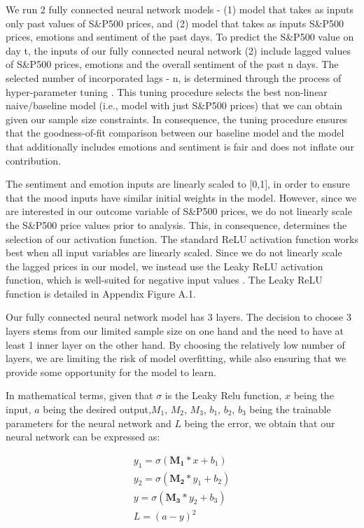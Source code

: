 We run 2 fully connected neural network models - (1) model that takes as inputs only past values of S\&P500 prices, and (2) model that takes as inputs S\&P500 prices, emotions and sentiment of the past days. To predict the S\&P500 value on day t, the inputs of our fully connected neural network (2) include lagged values of S\&P500 prices, emotions and the overall sentiment of the past n days. The selected number of incorporated lags - n, is determined through the process of hyper-parameter tuning \parencite{claesen2015hyperparameter}. This tuning procedure selects the best non-linear naive/baseline model (i.e., model with just S\&P500 prices) that we can obtain given our sample size constraints. In consequence, the tuning procedure ensures that the goodness-of-fit comparison between our baseline model and the model that additionally includes emotions and sentiment is fair and does not inflate our contribution.

The sentiment and emotion inputs are linearly scaled to [0,1], in order to ensure that the mood inputs have similar initial weights in the model. However, since we are interested in our outcome variable of S\&P500 prices, we do not linearly scale the S\&P500 price values prior to analysis. This, in consequence, determines the selection of our activation function. The standard ReLU activation function works best when all input variables are linearly scaled. Since we do not linearly scale the lagged prices in our model, we instead use the Leaky ReLU activation function, which is well-suited for negative input values \parencite{nwankpa2018activation}. The Leaky ReLU function is detailed in Appendix Figure A.1.
 
Our fully connected neural network model has 3 layers. The decision to choose 3 layers stems from our limited sample size on one hand and the need to have at least 1 inner layer on the other hand. By choosing the relatively low number of layers, we are limiting the risk of model overfitting, while also ensuring that we provide some opportunity for the model to learn.

In mathematical terms, given that $\sigma$ is the Leaky Relu function, $x$ being the input, $a$ being the desired output,$M_1$, $M_2$, $M_3$, $b_1$, $b_2$, $b_3$ being the trainable parameters for the neural network and $L$ being the error, we obtain that our neural network can be expressed as: 

\begin{ceqn}
\begin{align}
y_1 = \sigma(\mathbf{M_1} * x + b_1) \\
y_2 = \sigma(\mathbf{M_2} * y_1 + b_2) \\
y = \sigma(\mathbf{M_3} * y_2 + b_3) \\
L = (a - y)^2
\end{align}
\end{ceqn}

